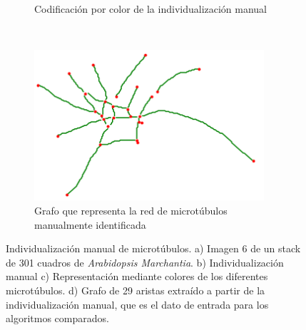 \begin{figure}[h!]
\begin{subfigure}[t]{0.49\textwidth}
        \caption{Codificaci\'on por color de la individualizaci\'on manual}
        \label{fig:SpinningMarchantia-indivManual}
    \end{subfigure}
    ~
    \begin{subfigure}[t]{0.49\textwidth}
        \centering
        \includegraphics[height=2.2in]{benchImages/50-ROIs-Spinning-Marchantia-graph-og.png}
        \caption{Grafo que representa la red de microt\'ubulos manualmente identificada}
        \label{fig:SpinningMarchantia-graph}
    \end{subfigure}
    \caption{Individualizaci\'on manual de microt\'ubulos. a) Imagen 6 de un stack de 301 cuadros de {\it Arabidopsis Marchantia}. b) Individualizaci\'on manual c) Representaci\'on mediante colores de los diferentes microt\'ubulos. d) Grafo de 29 aristas extra\'ido a partir de la individualizaci\'on manual, que es el dato de entrada para los algoritmos comparados.}
    \label{fig:SpinningMarchantia}
\end{figure}



